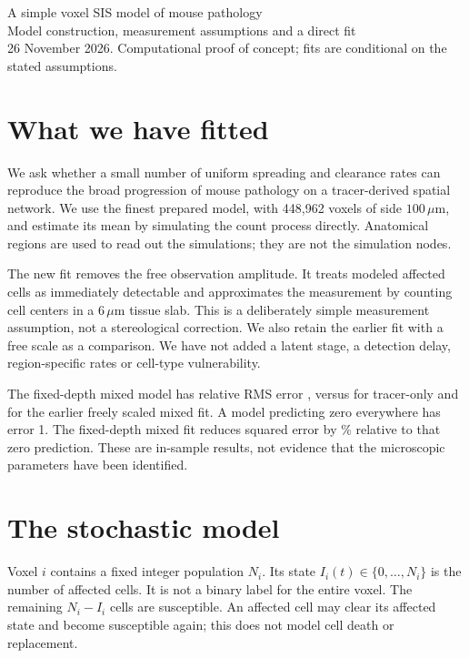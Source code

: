 \documentclass[10pt]{article}
\newcommand{\um}{\,\mu\mathrm{m}}\newcommand{\E}{\mathbb{E}}
\begin{document}
\begin{center}
{\LARGE A simple voxel SIS model of mouse pathology}\\[5pt]
{\large Model construction, measurement assumptions and a direct fit}\\[4pt]
\small 26 November 2026. Computational proof of concept; fits are conditional on the stated assumptions.
\end{center}

\section{What we have fitted}
We ask whether a small number of uniform spreading and clearance rates can reproduce the broad progression of mouse pathology on a tracer-derived spatial network. We use the finest prepared model, with 448,962 voxels of side $100\um$, and estimate its mean by simulating the count process directly. Anatomical regions are used to read out the simulations; they are not the simulation nodes.

The new fit removes the free observation amplitude. It treats modeled affected cells as immediately detectable and approximates the measurement by counting cell centers in a $6\um$ tissue slab. This is a deliberately simple measurement assumption, not a stereological correction. We also retain the earlier fit with a free scale as a comparison. We have not added a latent stage, a detection delay, region-specific rates or cell-type vulnerability.

The fixed-depth mixed model has relative RMS error \MixedError{}, versus \TracerError{} for tracer-only and \PreviousError{} for the earlier freely scaled mixed fit. A model predicting zero everywhere has error 1. The fixed-depth mixed fit reduces squared error by \MixedImprovement{}\% relative to that zero prediction. These are in-sample results, not evidence that the microscopic parameters have been identified.

\section{The stochastic model}
Voxel $i$ contains a fixed integer population $N_i$. Its state $I_i(t)\in\{0,\ldots,N_i\}$ is the number of affected cells. It is not a binary label for the entire voxel. The remaining $N_i-I_i$ cells are susceptible. An affected cell may clear its affected state and become susceptible again; this does not model cell death or replacement.
\end{document}
